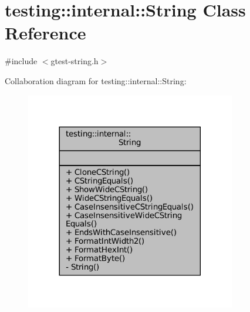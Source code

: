 \hypertarget{classtesting_1_1internal_1_1String}{}\section{testing\+:\+:internal\+:\+:String Class Reference}
\label{classtesting_1_1internal_1_1String}


{\ttfamily \#include $<$gtest-\/string.\+h$>$}



Collaboration diagram for testing\+:\+:internal\+:\+:String\+:
\nopagebreak
\begin{figure}[H]
\begin{center}
\leavevmode
\includegraphics[width=260pt]{classtesting_1_1internal_1_1String__coll__graph}
\end{center}
\end{figure}
